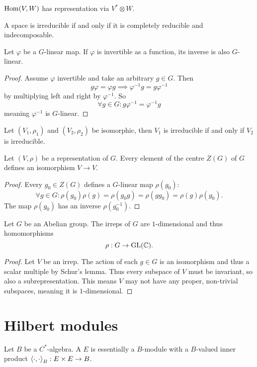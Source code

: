 $\operatorname{Hom}(V,W)$ has representation via $V^*\otimes W$.

A space is irreducible if and only if it is completely reducible and indecomposable.

\begin{proposition}
Let $\varphi$ be a $G$-linear map. If $\varphi$ is invertible as a function, its inverse is also $G$-linear.
\end{proposition}
\begin{proof}
Assume $\varphi$ invertible and take an arbitrary $g\in G$. Then
\[ g\varphi = \varphi g \implies \varphi^{-1} g = g \varphi^{-1} \]
by multiplying left and right by $\varphi^{-1}$. So
\[ \forall g\in G: g \varphi^{-1} = \varphi^{-1} g \]
meaning $\varphi^{-1}$ is $G$-linear.
\end{proof}

\begin{proposition}
Let $(V_1,\rho_1)$ and $(V_2,\rho_2)$ be isomorphic, then $V_1$ is irreducible \textup{if and only if} $V_2$ is irreducible.
\end{proposition}

\begin{proposition}
Let $(V,\rho)$ be a representation of $G$. Every element of the centre $Z(G)$ of $G$ defines an isomorphism $V\to V$.
\end{proposition}
\begin{proof}
Every $g_0\in Z(G)$ defines a $G$-linear map $\rho(g_0)$:
\[ \forall g\in G: \rho(g_0)\rho(g) = \rho(g_0g) = \rho(gg_0) = \rho(g) \rho(g_0). \]
The map $\rho(g_0)$ has an inverse $\rho(g_0^{-1})$.
\end{proof}

\begin{proposition}
Let $G$ be an Abelian group. The irreps of $G$ are $1$-dimensional and thus homomorphisms
\[ \rho: G\to \operatorname{GL}(\mathbb{C}). \]
\end{proposition}
\begin{proof}
Let $V$ be an irrep. The action of each $g\in G$ is an isomorphism and thus a scalar multiple by Schur's lemma. Thus every subspace of $V$ must be invariant, so also a subrepresentation. This means $V$ may not have any proper, non-trivial subspaces, meaning it is $1$-dimensional.
\end{proof}

\section{Hilbert modules}
Let $B$ be a $C^*$-algebra. A  $E$ is essentially a $B$-module with a $B$-valued inner product $\left\langle \cdot, \cdot \right\rangle_B: E\times E \to B$.


